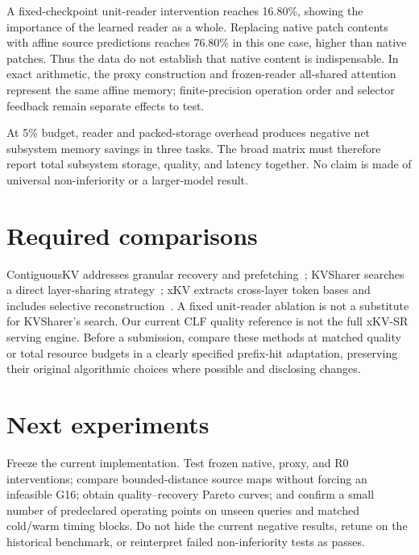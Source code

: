 \documentclass[10pt]{article}
\begin{document}
A fixed-checkpoint unit-reader intervention reaches 16.80\%, showing the importance
of the learned reader as a whole. Replacing native patch contents with affine
source predictions reaches 76.80\% in this one case, higher than native patches.
Thus the data do not establish that native content is indispensable. In exact
arithmetic, the proxy construction and frozen-reader all-shared attention represent
the same affine memory; finite-precision operation order and selector feedback
remain separate effects to test.

At 5\% budget, reader and packed-storage overhead produces negative net subsystem
memory savings in three tasks. The broad matrix must therefore report total
subsystem storage, quality, and latency together. No claim is made of universal
non-inferiority or a larger-model result.

\section{Required comparisons}
ContiguousKV addresses granular recovery and prefetching~\cite{contiguouskv};
KVSharer searches a direct layer-sharing strategy~\cite{kvsharer}; xKV extracts
cross-layer token bases and includes selective reconstruction~\cite{xkv}.
A fixed unit-reader ablation is not a substitute for KVSharer's search. Our current
CLF quality reference is not the full xKV-SR serving engine. Before a submission,
compare these methods at matched quality or total resource budgets in a clearly
specified prefix-hit adaptation, preserving their original algorithmic choices
where possible and disclosing changes.

\section{Next experiments}
Freeze the current implementation. Test frozen native, proxy, and R0 interventions;
compare bounded-distance source maps without forcing an infeasible G16; obtain
quality--recovery Pareto curves; and confirm a small number of predeclared operating
points on unseen queries and matched cold/warm timing blocks. Do not hide the
current negative results, retune on the historical benchmark, or reinterpret failed
non-inferiority tests as passes.



\end{document}
